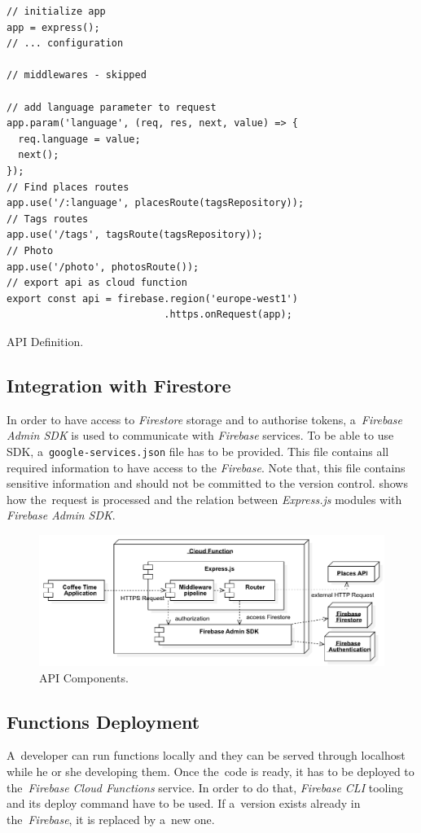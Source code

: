 \begin{listing}[ht]
\begin{verbatim}
// initialize app
app = express();
// ... configuration

// middlewares - skipped

// add language parameter to request
app.param('language', (req, res, next, value) => {
  req.language = value;
  next();
});
// Find places routes
app.use('/:language', placesRoute(tagsRepository));
// Tags routes
app.use('/tags', tagsRoute(tagsRepository));
// Photo
app.use('/photo', photosRoute());
// export api as cloud function
export const api = firebase.region('europe-west1')
                           .https.onRequest(app);
\end{verbatim}
\caption{API Definition.}
\label{listing:cta-index}
\end{listing}

\subsection{Integration with Firestore}
In order to have access to \textit{Firestore} storage and to authorise tokens, a~\textit{Firebase Admin SDK} is used to communicate with \textit{Firebase} services. To be able to use SDK, a~\verb|google-services.json| file has to be provided. This file contains all required information to have access to the \textit{Firebase}. Note that, this file contains sensitive information and should not be committed to the version control.  shows how the~request is processed and the relation between \textit{Express.js} modules with \textit{Firebase Admin SDK}.

\begin{figure}[ht]
    \centering
    \includegraphics[width=\linewidth]{img/implementation/coffee-api-components.pdf}
    \caption{API Components.}
    \label{fig:cta-relations}
\end{figure}

\subsection{Functions Deployment}
A~developer can run functions locally and they can be served through localhost while he or she developing them. Once the~code is ready, it has to be deployed to the~\textit{Firebase Cloud Functions} service. In order to do that, \textit{Firebase CLI} tooling and its deploy command have to be used. If a~version exists already in the~\textit{Firebase}, it is replaced by a~new one.

